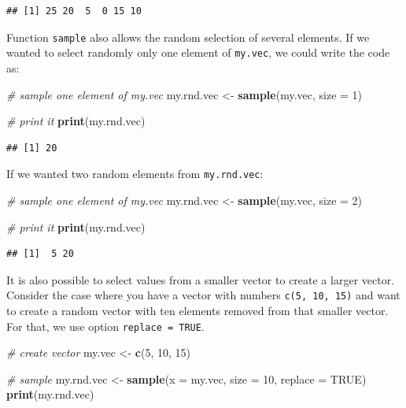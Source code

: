 \documentclass[11pt,]{book}
\newenvironment{Shaded}{\begin{snugshade}}{\end{snugshade}}
\newcommand{\KeywordTok}[1]{\textcolor[rgb]{0.27,0.27,0.27}{\textbf{#1}}}
\newcommand{\DataTypeTok}[1]{\textcolor[rgb]{0.27,0.27,0.27}{#1}}
\newcommand{\DecValTok}[1]{\textcolor[rgb]{0.06,0.06,0.06}{#1}}
\newcommand{\StringTok}[1]{\textcolor[rgb]{0.5,0.5,0.5}{#1}}
\newcommand{\CommentTok}[1]{\textcolor[rgb]{0.56,0.35,0.01}{\textit{#1}}}
\newcommand{\OtherTok}[1]{\textcolor[rgb]{0.56,0.35,0.01}{#1}}
\newcommand{\NormalTok}[1]{#1}
\begin{document}
\begin{verbatim}
## [1] 25 20  5  0 15 10
\end{verbatim}

Function \texttt{sample} also allows the random selection of several
elements. If we wanted to select randomly only one element of
\texttt{my.vec}, we could write the code as:

\begin{Shaded}
\begin{Highlighting}[]
\CommentTok{# sample one element of my.vec}
\NormalTok{my.rnd.vec <-}\StringTok{ }\KeywordTok{sample}\NormalTok{(my.vec, }\DataTypeTok{size =} \DecValTok{1}\NormalTok{)}

\CommentTok{# print it}
\KeywordTok{print}\NormalTok{(my.rnd.vec)}
\end{Highlighting}
\end{Shaded}

\begin{verbatim}
## [1] 20
\end{verbatim}

If we wanted two random elements from \texttt{my.rnd.vec}:

\begin{Shaded}
\begin{Highlighting}[]
\CommentTok{# sample one element of my.vec}
\NormalTok{my.rnd.vec <-}\StringTok{ }\KeywordTok{sample}\NormalTok{(my.vec, }\DataTypeTok{size =} \DecValTok{2}\NormalTok{)}

\CommentTok{# print it}
\KeywordTok{print}\NormalTok{(my.rnd.vec)}
\end{Highlighting}
\end{Shaded}

\begin{verbatim}
## [1]  5 20
\end{verbatim}

It is also possible to select values from a smaller vector to create a
larger vector. Consider the case where you have a vector with numbers
\texttt{c(5,\ 10,\ 15)} and want to create a random vector with ten
elements removed from that smaller vector. For that, we use option
\texttt{replace\ =\ TRUE}.

\begin{Shaded}
\begin{Highlighting}[]
\CommentTok{# create vector}
\NormalTok{my.vec <-}\StringTok{ }\KeywordTok{c}\NormalTok{(}\DecValTok{5}\NormalTok{, }\DecValTok{10}\NormalTok{, }\DecValTok{15}\NormalTok{)}

\CommentTok{# sample}
\NormalTok{my.rnd.vec <-}\StringTok{ }\KeywordTok{sample}\NormalTok{(}\DataTypeTok{x =}\NormalTok{ my.vec, }\DataTypeTok{size =} \DecValTok{10}\NormalTok{, }\DataTypeTok{replace =} \OtherTok{TRUE}\NormalTok{)}
\KeywordTok{print}\NormalTok{(my.rnd.vec)}
\end{Highlighting}
\end{Shaded}
\end{document}

